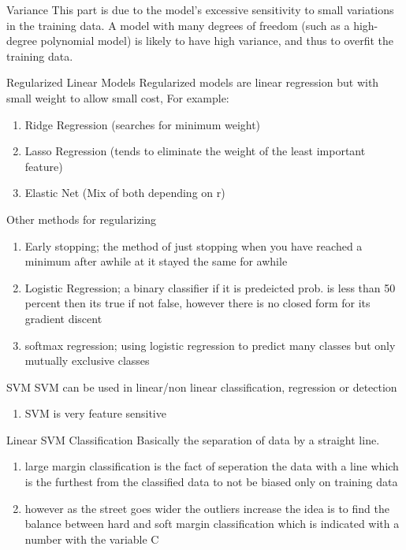 \documentclass{beamer}
\begin{document}
\begin{frame}{Variance}
This part is due to the model’s excessive sensitivity to small variations in the training data. A model with many degrees of freedom (such as a high-degree polynomial model) is likely to have high variance, and thus to overfit the training data. 
\end{frame}
\begin{frame}{Regularized Linear Models}
Regularized models are linear regression but with small weight to allow small cost, For example:
\begin{enumerate}
\item Ridge Regression (searches for minimum weight)
\item Lasso Regression (tends to eliminate the weight of the least important feature)
\item Elastic Net (Mix of both depending on r)
\end{enumerate}
\end{frame}
\begin{frame}{Other methods for regularizing}
\begin{enumerate}
\item Early stopping; the method of just stopping when you have reached a minimum after awhile at it stayed the same for awhile 
\item Logistic Regression; a binary classifier if it is predeicted prob. is less than 50 percent then its true if not false, however there is no closed form for its gradient discent
\item softmax regression; using logistic regression to predict many classes but only mutually exclusive classes
\end{enumerate}
\end{frame}
\begin{frame}{SVM}
SVM can be used in linear/non linear classification, regression or detection
\begin{enumerate}
\item SVM is very feature sensitive
\end{enumerate}
\end{frame}
\begin{frame}{Linear SVM Classification}
Basically the separation of data by a straight line.
\begin{enumerate}
\item large margin classification is the fact of seperation the data with a line which is the furthest from the classified data to not be biased only on training data
\item however as the street goes wider the outliers increase the idea is to find the balance between hard and soft margin classification which is indicated with a number with the variable C
\end{enumerate}
\end{frame}
\end{document}
